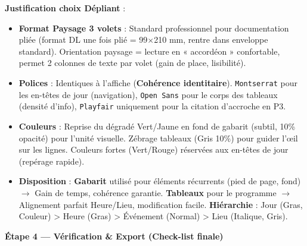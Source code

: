 \documentclass[11pt]{article}
\begin{document}
\begin{exoresolu}
\textbf{Justification choix Dépliant} :
\begin{itemize}
    \item \textbf{Format Paysage 3 volets} : Standard professionnel pour documentation pliée (format DL une fois plié = 99$\times$210 mm, rentre dans enveloppe standard). Orientation paysage = lecture en « accordéon » confortable, permet 2 colonnes de texte par volet (gain de place, lisibilité).
    \item \textbf{Polices} : Identiques à l'affiche (\textbf{Cohérence identitaire}). \texttt{Montserrat} pour les en-têtes de jour (navigation), \texttt{Open Sans} pour le corps des tableaux (densité d'info), \texttt{Playfair} uniquement pour la citation d'accroche en P3.
    \item \textbf{Couleurs} : Reprise du dégradé Vert/Jaune en fond de gabarit (subtil, 10\% opacité) pour l'unité visuelle. Zébrage tableaux (Gris 10\%) pour guider l'œil sur les lignes. Couleurs fortes (Vert/Rouge) réservées aux en-têtes de jour (repérage rapide).
    \item \textbf{Disposition} : \textbf{Gabarit} utilisé pour éléments récurrents (pied de page, fond) $\rightarrow$ Gain de temps, cohérence garantie. \textbf{Tableaux} pour le programme $\rightarrow$ Alignement parfait Heure/Lieu, modification facile. \textbf{Hiérarchie} : Jour (Gras, Couleur) > Heure (Gras) > Événement (Normal) > Lieu (Italique, Gris).
\end{itemize}

\textbf{Étape 4 — Vérification \& Export (Check-list finale)}


\end{exoresolu}
\end{document}
